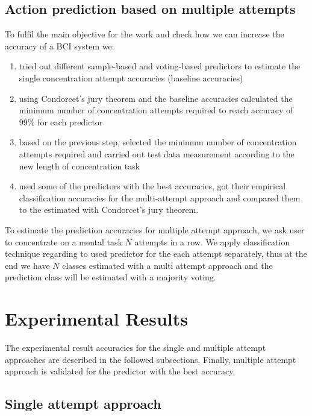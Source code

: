 \documentclass[12pt]{article}
\theoremstyle{definition}
\begin{document}
\subsection{Action prediction based on multiple attempts}
To fulfil the main objective for the work and check how we can increase the accuracy of a BCI system we:
\begin{enumerate}
\item tried out different sample-based and voting-based predictors to estimate the single concentration attempt accuracies (baseline accuracies)
\item using Condorcet's jury theorem and the baseline accuracies calculated the minimum number of concentration attempts required to reach accuracy of 99\% for each predictor
\item based on the previous step, selected the minimum number of concentration attempts required and carried out test data measurement according to the new length of concentration task
\item used some of the predictors with the best accuracies, got their empirical classification accuracies for the multi-attempt approach and compared them to the estimated with Condorcet's jury theorem.
\end{enumerate}

To estimate the prediction accuracies for multiple attempt approach, we ask user to concentrate on a mental task $N$ attempts in a row. We apply classification technique regarding to used predictor for the each attempt separately, thus at the end we have $N$ classes estimated with a multi attempt approach and the prediction class will be estimated with a majority voting.

\newpage
\section{Experimental Results}

The experimental result accuracies for the single and multiple attempt approaches are described in the followed subsections. Finally, multiple attempt approach is validated for the predictor with the best accuracy.


\subsection{Single attempt approach}
\end{document}
